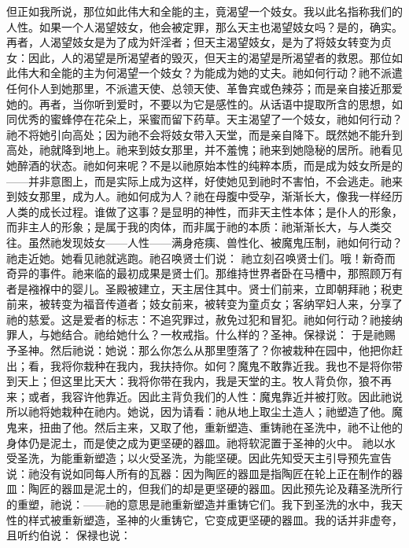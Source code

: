 但正如我所说，那位如此伟大和全能的主，竟渴望一个妓女。我以此名指称我们的人性。如果一个人渴望妓女，他会被定罪，那么天主也渴望妓女吗？是的，确实。再者，人渴望妓女是为了成为奸淫者；但天主渴望妓女，是为了将妓女转变为贞女：因此，人的渴望是所渴望者的毁灭，但天主的渴望是所渴望者的救恩。那位如此伟大和全能的主为何渴望一个妓女？为能成为她的丈夫。祂如何行动？祂不派遣任何仆人到她那里，不派遣天使、总领天使、革鲁宾或色辣芬；而是亲自接近那爱她的。再者，当你听到爱时，不要以为它是感性的。从话语中提取所含的思想，如同优秀的蜜蜂停在花朵上，采蜜而留下药草。天主渴望了一个妓女，祂如何行动？祂不将她引向高处；因为祂不会将妓女带入天堂，而是亲自降下。既然她不能升到高处，祂就降到地上。祂来到妓女那里，并不羞愧；祂来到她隐秘的居所。祂看见她醉酒的状态。祂如何来呢？不是以祂原始本性的纯粹本质，而是成为妓女所是的——并非意图上，而是实际上成为这样，好使她见到祂时不害怕，不会逃走。祂来到妓女那里，成为人。祂如何成为人？祂在母腹中受孕，渐渐长大，像我一样经历人类的成长过程。谁做了这事？是显明的神性，而非天主性本体；是仆人的形象，而非主人的形象；是属于我的肉体，而非属于祂的本质：祂渐渐长大，与人类交往。虽然祂发现妓女——人性——满身疮痍、兽性化、被魔鬼压制，祂如何行动？祂走近她。她看见祂就逃跑。祂召唤贤士们说： 祂立刻召唤贤士们。哦！新奇而奇异的事件。祂来临的最初成果是贤士们。那维持世界者卧在马槽中，那照顾万有者是襁褓中的婴儿。圣殿被建立，天主居住其中。贤士们前来，立即朝拜祂；税吏前来，被转变为福音传道者；妓女前来，被转变为童贞女；客纳罕妇人来，分享了祂的慈爱。这是爱者的标志：不追究罪过，赦免过犯和冒犯。祂如何行动？祂接纳罪人，与她结合。祂给她什么？一枚戒指。什么样的？圣神。保禄说： 于是祂赐予圣神。然后祂说：她说：那么你怎么从那里堕落了？你被栽种在园中，他把你赶出；看，我将你栽种在我内，我扶持你。如何？魔鬼不敢靠近我。我也不是将你带到天上；但这里比天大：我将你带在我内，我是天堂的主。牧人背负你，狼不再来；或者，我容许他靠近。因此主背负我们的人性：魔鬼靠近并被打败。因此祂说所以祂将她栽种在祂内。她说，因为请看：祂从地上取尘土造人；祂塑造了他。魔鬼来，扭曲了他。然后主来，又取了他，重新塑造、重铸祂在圣洗中，祂不让他的身体仍是泥土，而是使之成为更坚硬的器皿。祂将软泥置于圣神的火中。 祂以水受圣洗，为能重新塑造；以火受圣洗，为能坚硬。因此先知受天主引导预先宣告说：祂没有说如同每人所有的瓦器：因为陶匠的器皿是指陶匠在轮上正在制作的器皿：陶匠的器皿是泥土的，但我们的却是更坚硬的器皿。因此预先论及藉圣洗所行的重塑，祂说：——祂的意思是祂重新塑造并重铸它们。我下到圣洗的水中，我天性的样式被重新塑造，圣神的火重铸它，它变成更坚硬的器皿。我的话并非虚夸，且听约伯说： 保禄也说： 